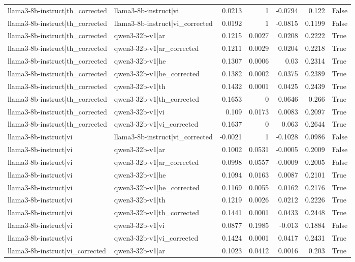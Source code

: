 \begin{table}
\begin{tabular}{l l r r r r l}
llama3-8b-instruct|th_corrected & llama3-8b-instruct|vi & 0.0213 & 1 & -0.0794 & 0.122 & False \\
llama3-8b-instruct|th_corrected & llama3-8b-instruct|vi_corrected & 0.0192 & 1 & -0.0815 & 0.1199 & False \\
llama3-8b-instruct|th_corrected & qwen3-32b-v1|ar & 0.1215 & 0.0027 & 0.0208 & 0.2222 & True \\
llama3-8b-instruct|th_corrected & qwen3-32b-v1|ar_corrected & 0.1211 & 0.0029 & 0.0204 & 0.2218 & True \\
llama3-8b-instruct|th_corrected & qwen3-32b-v1|he & 0.1307 & 0.0006 & 0.03 & 0.2314 & True \\
llama3-8b-instruct|th_corrected & qwen3-32b-v1|he_corrected & 0.1382 & 0.0002 & 0.0375 & 0.2389 & True \\
llama3-8b-instruct|th_corrected & qwen3-32b-v1|th & 0.1432 & 0.0001 & 0.0425 & 0.2439 & True \\
llama3-8b-instruct|th_corrected & qwen3-32b-v1|th_corrected & 0.1653 & 0 & 0.0646 & 0.266 & True \\
llama3-8b-instruct|th_corrected & qwen3-32b-v1|vi & 0.109 & 0.0173 & 0.0083 & 0.2097 & True \\
llama3-8b-instruct|th_corrected & qwen3-32b-v1|vi_corrected & 0.1637 & 0 & 0.063 & 0.2644 & True \\
llama3-8b-instruct|vi & llama3-8b-instruct|vi_corrected & -0.0021 & 1 & -0.1028 & 0.0986 & False \\
llama3-8b-instruct|vi & qwen3-32b-v1|ar & 0.1002 & 0.0531 & -0.0005 & 0.2009 & False \\
llama3-8b-instruct|vi & qwen3-32b-v1|ar_corrected & 0.0998 & 0.0557 & -0.0009 & 0.2005 & False \\
llama3-8b-instruct|vi & qwen3-32b-v1|he & 0.1094 & 0.0163 & 0.0087 & 0.2101 & True \\
llama3-8b-instruct|vi & qwen3-32b-v1|he_corrected & 0.1169 & 0.0055 & 0.0162 & 0.2176 & True \\
llama3-8b-instruct|vi & qwen3-32b-v1|th & 0.1219 & 0.0026 & 0.0212 & 0.2226 & True \\
llama3-8b-instruct|vi & qwen3-32b-v1|th_corrected & 0.1441 & 0.0001 & 0.0433 & 0.2448 & True \\
llama3-8b-instruct|vi & qwen3-32b-v1|vi & 0.0877 & 0.1985 & -0.013 & 0.1884 & False \\
llama3-8b-instruct|vi & qwen3-32b-v1|vi_corrected & 0.1424 & 0.0001 & 0.0417 & 0.2431 & True \\
llama3-8b-instruct|vi_corrected & qwen3-32b-v1|ar & 0.1023 & 0.0412 & 0.0016 & 0.203 & True \\

\end{tabular}
\end{table}
